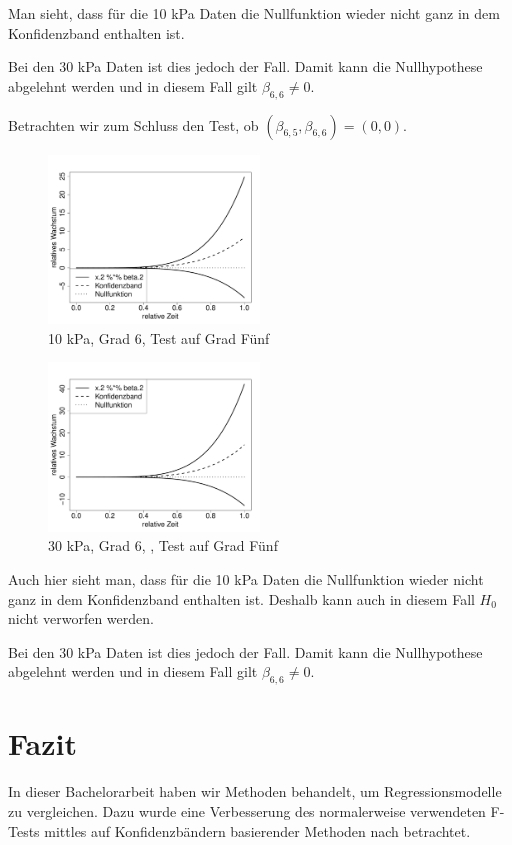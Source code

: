 \documentclass[12pt,a4paper]{article}
\theoremstyle{definition}
\theoremstyle{definition}
\theoremstyle{definition}
\theoremstyle{definition}
\begin{document}
Man sieht, dass für die 10 kPa Daten die Nullfunktion wieder nicht ganz in dem Konfidenzband enthalten ist.

Bei den 30 kPa Daten ist dies jedoch der Fall. Damit kann die Nullhypothese abgelehnt werden und in diesem Fall gilt $\beta_{6,6} \neq 0$.

Betrachten wir zum Schluss den Test, ob $(\beta_{6,5}, \beta_{6,6}) = (0,0)$.

\begin{figure}[H] 
  \centering
     \includegraphics[width=0.5\textwidth]{10kPa-Grad-6-2-KB}
  \caption{10 kPa, Grad 6, Test auf Grad Fünf}
  \label{10kPa Grad 6.2}
\end{figure}

\begin{figure}[H] 
  \centering
     \includegraphics[width=0.5\textwidth]{30kPa-Grad-6-2-KB}
  \caption{30 kPa, Grad 6, , Test auf Grad Fünf}
  \label{30kPa Grad 6.2}
\end{figure}

Auch hier sieht man, dass für die 10 kPa Daten die Nullfunktion wieder nicht ganz in dem Konfidenzband enthalten ist. Deshalb kann auch in diesem Fall $H_0$ nicht verworfen werden.

Bei den 30 kPa Daten ist dies jedoch der Fall. Damit kann die Nullhypothese abgelehnt werden und in diesem Fall gilt $\beta_{6,6} \neq 0$.



\newpage
\section*{Fazit}
In dieser Bachelorarbeit haben wir Methoden behandelt, um Regressionsmodelle zu vergleichen. Dazu wurde eine Verbesserung des normalerweise verwendeten F-Tests mittles auf Konfidenzbändern basierender Methoden nach \cite{Liu64} betrachtet.
\end{document}
